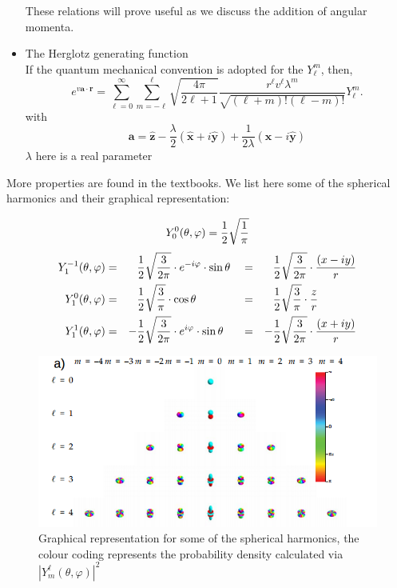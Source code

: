 \begin{itemize}
\begin{equation}
	\end{equation}
	These relations will prove useful as we discuss the addition of angular momenta.
	\item The Herglotz generating function \\
	If the quantum mechanical convention is adopted for the $Y_{\ell}^m$, then,
	\begin{equation}
	e^{v{\mathbf a}\cdot{\mathbf r}}
	= \sum_{\ell=0}^{\infty} \sum_{m = -\ell}^{\ell}
	\sqrt{\frac{4\pi}{2\ell +1}}
	\frac{r^{\ell} v^{\ell} {\lambda^m}}{\sqrt{(\ell +m)!(\ell-m)!}} Y_{\ell}^m.
	\end{equation}
	with
	\begin{equation}
	{\mathbf a}
	= {\mathbf{\hat z}}
	- \frac{\lambda}{2}({\mathbf{\hat x}} + i {\mathbf{\hat y}})
	+ \frac{1}{2\lambda}({\mathbf{\hat x}} - i {\mathbf{\hat y}})
	\end{equation}
	$\lambda$ here is a real parameter
\end{itemize}
More properties are found in the textbooks. We list here some of the spherical harmonics and their graphical representation:

\begin{align}
Y_{0}^{0}(\theta,\varphi)={1\over 2}\sqrt{1\over \pi}
\end{align}
\begin{align}
Y_{1}^{-1}(\theta,\varphi) &= & & {1\over 2}\sqrt{3\over 2\pi}\cdot e^{-i\varphi}\cdot\sin\theta & &= & &{1\over 2}\sqrt{3\over 2\pi} \cdot{(x-iy)\over r} \\
Y_{1}^{0}(\theta,\varphi)  &= & & {1\over 2}\sqrt{3\over  \pi}\cdot                   \cos\theta & &= & &{1\over 2}\sqrt{3\over  \pi} \cdot{z\over r} \\
Y_{1}^{1}(\theta,\varphi)  &= &-& {1\over 2}\sqrt{3\over 2\pi}\cdot e^{i\varphi}\cdot \sin\theta & &= &-&{1\over 2}\sqrt{3\over 2\pi} \cdot{(x+iy)\over r}
\end{align}

\begin{figure}[h!]
	\includegraphics[scale=0.6]{./figures/spherical}
	\caption{Graphical representation for some of the spherical harmonics, the colour coding represents the probability density calculated via $|Y_{m} ^ {\ell} ( \theta, \varphi)|^2$}
\end{figure}
